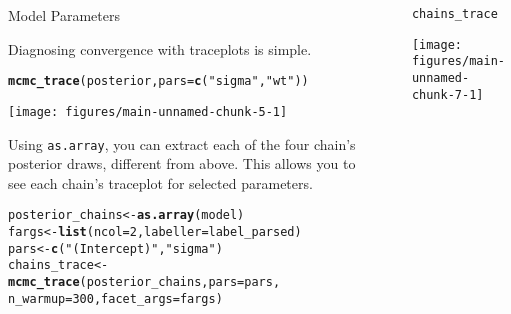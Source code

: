 \documentclass[final,9pt,fleqn]{beamer}\usepackage[]{graphicx}\usepackage[]{color}
\makeatletter
\def\maxwidth{ %
  \ifdim\Gin@nat@width>\linewidth
    \linewidth
  \else
    \Gin@nat@width
  \fi
}
\newcommand{\hlnum}[1]{\textcolor[rgb]{0.686,0.059,0.569}{#1}}%
\newcommand{\hlstr}[1]{\textcolor[rgb]{0.192,0.494,0.8}{#1}}%
\newcommand{\hlstd}[1]{\textcolor[rgb]{0.345,0.345,0.345}{#1}}%
\newcommand{\hlkwb}[1]{\textcolor[rgb]{0.69,0.353,0.396}{#1}}%
\newcommand{\hlkwc}[1]{\textcolor[rgb]{0.333,0.667,0.333}{#1}}%
\newcommand{\hlkwd}[1]{\textcolor[rgb]{0.737,0.353,0.396}{\textbf{#1}}}%
\newenvironment{kframe}{%
 \def\at@end@of@kframe{}%
 \ifinner\ifhmode%
  \def\at@end@of@kframe{\end{minipage}}%
  \begin{minipage}{\columnwidth}%
 \fi\fi%
 \def\FrameCommand##1{\hskip\@totalleftmargin \hskip-\fboxsep
 \colorbox{shadecolor}{##1}\hskip-\fboxsep
     \hskip-\linewidth \hskip-\@totalleftmargin \hskip\columnwidth}%
 \MakeFramed {\advance\hsize-\width
   \@totalleftmargin\z@ \linewidth\hsize
   \@setminipage}}%
 {\par\unskip\endMakeFramed%
 \at@end@of@kframe}
\newenvironment{knitrout}{}{} %
\makeatother
\begin{document}
\begin{frame}[fragile]
\begin{columns}
\begin{column}{0.3\paperwidth}
\begin{block}{{\huge Model Parameters}}
\begin{knitrout}
\end{knitrout}

Diagnosing convergence with traceplots is simple.
\begin{knitrout}
\color{fgcolor}\begin{kframe}
\begin{alltt}
\hlkwd{mcmc_trace}\hlstd{(posterior,} \hlkwc{pars}\hlstd{=}\hlkwd{c}\hlstd{(}\hlstr{"sigma"}\hlstd{,} \hlstr{"wt"}\hlstd{))}
\end{alltt}
\end{kframe}
\texttt{[image: figures/main-unnamed-chunk-5-1]} 

\end{knitrout}

Using \texttt{as.array}, you can extract each of the four chain's
posterior draws, different from above.  This allows you to see each
chain's traceplot for selected parameters.

\begin{knitrout}
\color{fgcolor}\begin{kframe}
\begin{alltt}
\hlstd{posterior_chains} \hlkwb{<-} \hlkwd{as.array}\hlstd{(model)}
\hlstd{fargs} \hlkwb{<-} \hlkwd{list}\hlstd{(}\hlkwc{ncol} \hlstd{=} \hlnum{2}\hlstd{,} \hlkwc{labeller} \hlstd{= label_parsed)}
\hlstd{pars} \hlkwb{<-} \hlkwd{c}\hlstd{(}\hlstr{"(Intercept)"}\hlstd{,} \hlstr{"sigma"}\hlstd{)}
\hlstd{chains_trace} \hlkwb{<-} \hlkwd{mcmc_trace}\hlstd{(posterior_chains,} \hlkwc{pars} \hlstd{= pars,}
                           \hlkwc{n_warmup} \hlstd{=} \hlnum{300}\hlstd{,} \hlkwc{facet_args} \hlstd{= fargs)}
\end{alltt}
\end{kframe}
\end{knitrout}
\end{block}
\end{column}


\begin{column}{.03\paperwidth}
\end{column}


\begin{column}{0.3\paperwidth}
\begin{knitrout}
\color{fgcolor}\begin{kframe}
\begin{alltt}
\hlstd{chains_trace}
\end{alltt}
\end{kframe}
\texttt{[image: figures/main-unnamed-chunk-7-1]} 


\end{knitrout}
\end{column}
\end{columns}
\end{frame}
\end{document}
